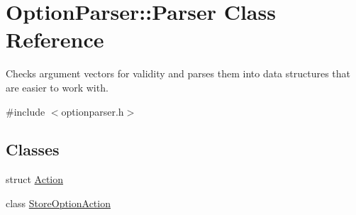\hypertarget{class_option_parser_1_1_parser}{\section{Option\-Parser\-:\-:Parser Class Reference}
\label{class_option_parser_1_1_parser}
}


Checks argument vectors for validity and parses them into data structures that are easier to work with.  




{\ttfamily \#include $<$optionparser.\-h$>$}

\subsection*{Classes}
\begin{DoxyCompactItemize}
\item 
struct \hyperlink{struct_option_parser_1_1_parser_1_1_action}{Action}
\item 
class \hyperlink{class_option_parser_1_1_parser_1_1_store_option_action}{Store\-Option\-Action}
\end{DoxyCompactItemize}
